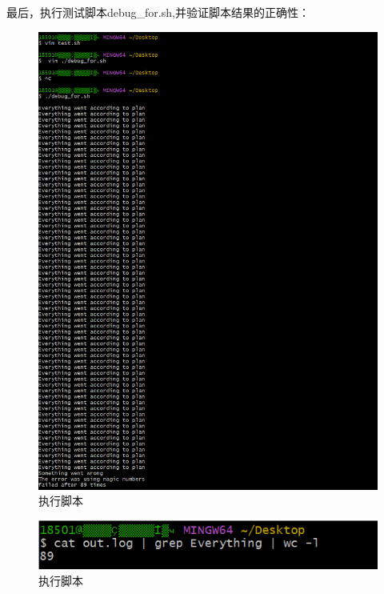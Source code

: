 \documentclass{ctexart}
\begin{document}
\begin{enumerate}
    最后，执行测试脚本debug\_for.sh,并验证脚本结果的正确性：\\
\begin{figure}[H]
    \centering
    \includegraphics[width=14cm]{4c5ec2d33e22bdcedd1487fe534c4e52.png}
    \caption{执行脚本}
    \label{fig:3}
\end{figure}

\begin{figure}[H]
    \centering
    \includegraphics[width=14cm]{da5fa2fa70efc6918817e5af237e38dd.png}
    \caption{执行脚本}
    \label{fig:3}
\end{figure}

\end{enumerate}
\end{document}
